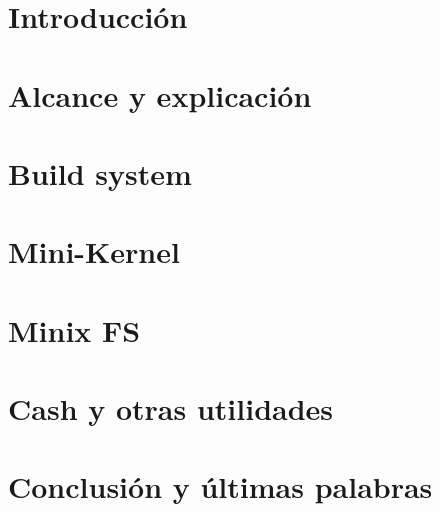 \section{Introducción}


\newpage
\section{Alcance y explicación}


\newpage
\section{Build system}


\newpage
\section{Mini-Kernel}


\newpage
\section{Minix FS}


\newpage
\section{Cash y otras utilidades}


\newpage
\section{Conclusión y últimas palabras}


